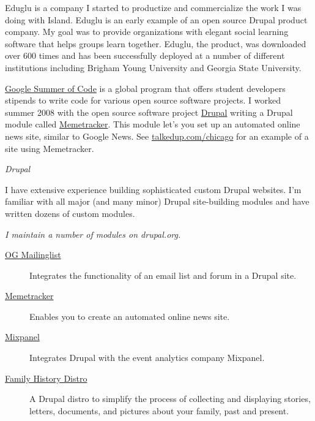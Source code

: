 \documentclass[11pt]{article}
\begin{document}
\bigskip


\noindent Eduglu is a company I started to productize and commercialize the work I was doing with Island. Eduglu is an early example of an open source Drupal product company. My goal was to provide organizations with elegant social learning software that helps groups learn together. Eduglu, the product, was downloaded over 600 times and has been successfully deployed at a number of different institutions including Brigham Young University and Georgia State University.

\bigskip


\noindent\href{http://code.google.com/soc/}{Google Summer of Code} is a global program that offers student developers stipends to write code for various open source software projects. I worked summer 2008 with the open source software project \href{http://drupal.org}{Drupal} writing a Drupal module called \href{http://drupal.org/project/memetracker}{Memetracker}. This module let's you set up an automated online news site, similar to Google News. See \href{http://www.talkedup.com/chicago}{talkedup.com/chicago} for an example of a site using Memetracker.

\bigskip



\medskip

\noindent\emph{Drupal \vspace{0.15in}}

\noindent I have extensive experience building sophisticated custom Drupal websites. I'm familiar with all major (and many minor) Drupal site-building modules and have written dozens of custom modules.

\bigskip

\noindent \emph{I maintain a number of modules on drupal.org.}

\begin{description}
  \item[\href{http://drupal.org/project/og_mailinglist}{OG Mailinglist}] Integrates the functionality of an email list and forum in a Drupal site.
  \item[\href{http://drupal.org/project/memetracker}{Memetracker}] Enables you to create an automated online news site.
  \item[\href{http://drupal.org/project/mixpanel}{Mixpanel}] Integrates Drupal with the event analytics company Mixpanel.
  \item[\href{http://drupal.org/project/family_history}{Family History Distro}] A Drupal distro to simplify the process of collecting and displaying stories, letters, documents, and pictures about your family, past and present.
\end{description}
\end{document}
